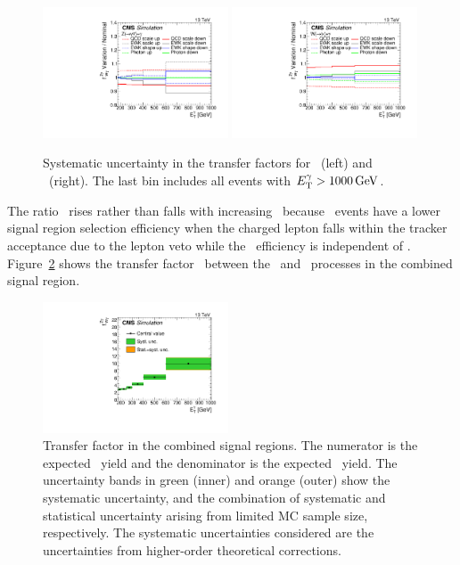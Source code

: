 \begin{figure}[htbp]
  \centering
    \includegraphics[width=0.49\textwidth]{Analysis/Figures/tf_syst_zg.pdf}
    \includegraphics[width=0.49\textwidth]{Analysis/Figures/tf_syst_wg.pdf}
    \caption{
      Systematic uncertainty in the transfer factors for \zinvg\ (left) and \wlng\ (right). The last bin includes all events with $E_{\mathrm{T}}^{\gamma} > 1000\,\text{Ge\hspace{-.08em}V}$.
    }
    \label{fig:tf_syst}
\end{figure}

The ratio \fZW\ rises rather than falls with increasing \ETg\ because \wlng\ events have a lower signal region selection efficiency when the charged lepton falls within the tracker acceptance due to the lepton veto while the \zinvg\ efficiency is independent of \ETg.
Figure~\ref{fig:tf_wz} shows the transfer factor \fZW\ between the \zinvg\ and \wlng\ processes in the combined signal region.


\begin{figure}[htbp]
  \centering
    \includegraphics[width=0.49\textwidth]{Analysis/Figures/fZW.pdf}
    \caption{
      Transfer factor \fZW in the combined signal regions.
      The numerator is the expected \zinvg\ yield and the denominator is the expected \wlng\ yield.
      The uncertainty bands in green (inner) and orange (outer) show the systematic uncertainty, and the combination of systematic and statistical uncertainty arising from limited MC sample size, respectively. 
      The systematic uncertainties considered are the uncertainties from higher-order theoretical corrections.
    }
    \label{fig:tf_wz}
\end{figure}

